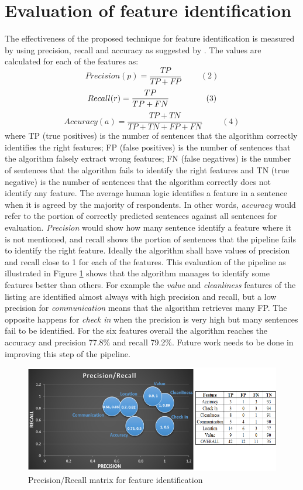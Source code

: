 \section{Evaluation of feature identification}
The effectiveness of the proposed technique for feature identification is measured by using precision, recall and accuracy as suggested by \cite{huang2006performance}. The values are calculated for each of the features as:
$$ Precision  (p) =\frac{TP}{TP+FP}\hspace{1cm}(2)$$
$$ Recall  (r) = \frac{TP}{TP + FN}\hspace{1.6cm}(3) $$
$$ Accuracy (a) = \frac{TP + TN}{TP+TN+FP+FN} \hspace{1cm}(4)$$
where TP (true positives) is the number of sentences that the algorithm correctly identifies the right features; FP (false positives) is the number of sentences that the algorithm falsely extract wrong features; FN (false negatives) is the number of sentences that the algorithm fails to identify the right features and TN (true negative) is the number of sentences that the algorithm correctly does not identify any feature. The average human logic identifies a feature in a sentence when it is agreed by the majority of respondents. In other words, \textit{accuracy} would refer to the portion of correctly predicted sentences against all sentences for evaluation.  \textit{Precision} would show how many sentence identify a feature where it is not mentioned, and recall shows the portion of sentences that the pipeline fails to identify the right feature. Ideally the algorithm shall have values of precision and recall close to 1 for each of the features. This evaluation of the pipeline as illustrated in Figure \ref{fig:matrix} shows that the algorithm manages to identify some features better than others. For example the \textit{value} and \textit{cleanliness} features of the listing are identified almost always with high precision and recall, but a low precision for \textit{communication} means that the algorithm retrieves many FP. The opposite happens for \textit{check in} when the precision is very high but many sentences fail to be identified. For the six features overall the algorithm reaches the accuracy and precision 77.8\% and recall 79.2\%. Future work needs to be done in improving this step of the pipeline.
\begin{figure}[h!]
	\centering
	\includegraphics[height=0.3\textheight]{PR_table}
	\caption{Precision/Recall matrix for feature identification}
	\label{fig:matrix}
\end{figure}